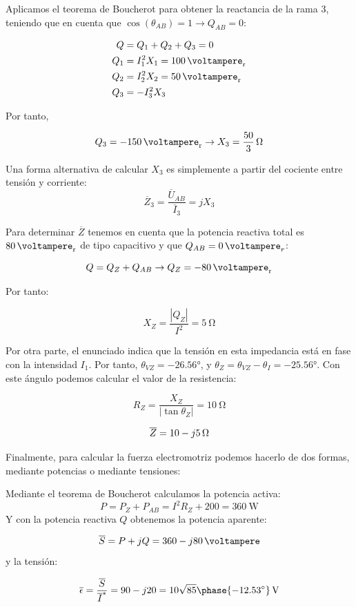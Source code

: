 Aplicamos el teorema de Boucherot para obtener la reactancia de la rama 3, teniendo que en cuenta que $\cos(\theta_{AB}) = 1 \rightarrow Q_{AB} = 0$:

\begin{align*}
  Q &= Q_1 + Q_2 + Q_3 = 0\\
  Q_1 &= I_1^2 X_1 = \qty{100}{\voltampere_r}\\
  Q_2 &= I_2^2 X_2 = \qty{50}{\voltampere_r}\\
  Q_3 &= - I_3^2 X_3
\end{align*}

Por tanto,

\[
   Q_3 = -\qty{150}{\voltampere_r} \rightarrow X_3 = \qty[parse-numbers=false]{\frac{50}{3}}{\ohm}
\]

Una forma alternativa de calcular $X_3$ es simplemente a partir del cociente entre tensión y corriente: 
\[
    \overline{Z}_3 = \frac{\overline{U}_{AB}}{\overline{I}_3} = j X_3
\]

Para determinar $\overline{Z}$ tenemos en cuenta que la potencia reactiva total es $\qty{80}{\voltampere_r}$ de tipo capacitivo y que $Q_{AB} = \qty{0}{\voltampere}_r$:

\[
  Q = Q_Z + Q_{AB} \rightarrow Q_Z = -\qty{80}{\voltampere_r} 
\]

Por tanto:

\[
  X_Z = \frac{|Q_Z|}{I^2} = \qty{5}{\ohm}
\]

Por otra parte, el enunciado indica que la tensión en esta impedancia está en fase con la intensidad $I_1$. Por tanto, $\theta_{VZ} = \ang{-26.56}$, y $\theta_Z = \theta_{VZ} - \theta_{I} = \ang{-25.56}$. Con este ángulo podemos calcular el valor de la resistencia:

\[
  R_Z = \frac{X_Z}{|\tan\theta_Z|} = \qty{10}{\ohm}
\]

\[
  \overline{Z} =  \qty[parse-numbers=false]{10 - j5}{\ohm}
\]

Finalmente, para calcular la fuerza electromotriz podemos hacerlo de dos formas, mediante potencias o mediante tensiones:

Mediante el teorema de Boucherot calculamos la potencia activa:
\[
P = P_Z + P_{AB} = I^2 R_Z + 200 = \qty{360}{\watt}
\]
Y con la potencia reactiva $Q$ obtenemos la potencia aparente:

\[
  \overline{S} = P + jQ = \qty[parse-numbers=false]{360 -j80}{\voltampere}
\]
y la tensión:

\[
  \overline{\epsilon} = \frac{\overline{S}}{\overline{I}^*} = 90 - j20 = \qty[parse-numbers=false]{10\sqrt{85}\phase{\ang{-12.53}}}{\volt}
\]

